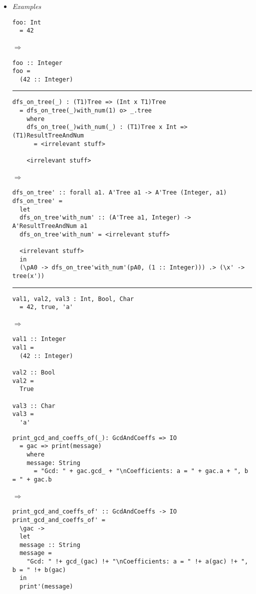 \documentclass[diploma]{softlab-thesis}
\def\lra{$\Longrightarrow$\ }
\begin{document}
\begin{itemize}
\item
\textit{Examples}
\begin{verbatim}
foo: Int
  = 42
\end{verbatim}
\lra
\begin{verbatim}
foo :: Integer
foo =
  (42 :: Integer)
\end{verbatim}

\rule{\linewidth}{0.1pt}

\begin{verbatim}
dfs_on_tree(_) : (T1)Tree => (Int x T1)Tree
  = dfs_on_tree(_)with_num(1) o> _.tree
    where
    dfs_on_tree(_)with_num(_) : (T1)Tree x Int => (T1)ResultTreeAndNum
      = <irrelevant stuff>

    <irrelevant stuff>
\end{verbatim} \lra
\begin{verbatim}
dfs_on_tree' :: forall a1. A'Tree a1 -> A'Tree (Integer, a1)
dfs_on_tree' =
  let
  dfs_on_tree'with_num' :: (A'Tree a1, Integer) -> A'ResultTreeAndNum a1
  dfs_on_tree'with_num' = <irrelevant stuff>

  <irrelevant stuff>
  in
  (\pA0 -> dfs_on_tree'with_num'(pA0, (1 :: Integer))) .> (\x' -> tree(x'))
\end{verbatim}

\rule{\linewidth}{0.1pt}

\begin{verbatim}
val1, val2, val3 : Int, Bool, Char
  = 42, true, 'a'
\end{verbatim} \lra
\begin{verbatim}
val1 :: Integer
val1 =
  (42 :: Integer)

val2 :: Bool
val2 =
  True

val3 :: Char
val3 =
  'a'
\end{verbatim}

\newpage

\begin{verbatim}
print_gcd_and_coeffs_of(_): GcdAndCoeffs => IO
  = gac => print(message)
    where
    message: String
      = "Gcd: " + gac.gcd_ + "\nCoefficients: a = " + gac.a + ", b = " + gac.b
\end{verbatim}
\lra
\begin{verbatim}
print_gcd_and_coeffs_of' :: GcdAndCoeffs -> IO
print_gcd_and_coeffs_of' =
  \gac ->
  let
  message :: String
  message =
    "Gcd: " !+ gcd_(gac) !+ "\nCoefficients: a = " !+ a(gac) !+ ", b = " !+ b(gac)
  in
  print'(message)
\end{verbatim}


\end{itemize}
\end{document}
